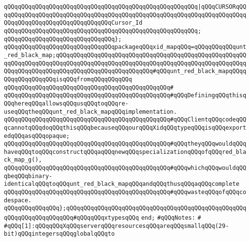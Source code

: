 \verb|qQQqqQQqqQQqqQQqqQQqqQQqqQQqqQQqqQQqqQQqqQQqqQQqqQQqqQQq|\verb#|qQQqCURSORqQQqqQQqqQQqqQQqqQQqqQQqqQQqqQQqqQQqqQQqqQQqqQQqqQQqqQQqqQQqqQQqqQQqqQQqqQQqqQQqqQQqqQQqqQQqqQQqqQQqqQQqCursor_Id#\newline
\verb|qQQqqQQqqQQqqQQqqQQqqQQqqQQqqQQqqQQqqQQqqQQqqQQqqQQqqQQq;|\newline
\verb|qQQqqQQqqQQqqQQqqQQqqQQqqQQqqQQq};|\newline
\newline
\verb|qQQqqQQqqQQqqQQqqQQqqQQqqQQqqQQqpackageqQQqxid_mapqQQq=qQQqqQQqqQQqunt_red_black_map;qQQqqQQqqQQqqQQqqQQqqQQqqQQqqQQqqQQqqQQqqQQqqQQqqQQqqQQqqQQqqQQqqQQqqQQqqQQqqQQqqQQqqQQqqQQqqQQqqQQqqQQqqQQqqQQqqQQqqQQqqQQqqQQqqQQqqQQqqQQqqQQqqQQqqQQqqQQqqQQqqQQqqQQq#qQQqunt_red_black_mapqQQqqQQqqQQqqQQqqQQqisqQQqfromqQQqqQQqqQQq|\newline
\verb|qQQqqQQqqQQqqQQqqQQqqQQqqQQqqQQqqQQqqQQqqQQqqQQq#|\newline
\verb|qQQqqQQqqQQqqQQqqQQqqQQqqQQqqQQqqQQqqQQqqQQqqQQq#qQQqDefiningqQQqthisqQQqhereqQQqallowsqQQqusqQQqtoqQQqre-useqQQqtheqQQqunt_red_black_mapqQQqimplementation.|\newline
\verb|qQQqqQQqqQQqqQQqqQQqqQQqqQQqqQQqqQQqqQQqqQQqqQQq#qQQqClientqQQqcodeqQQqcannotqQQqdoqQQqthisqQQqbecauseqQQqourqQQqXidqQQqtypeqQQqisqQQqexportedqQQqasqQQqopaque;|\newline
\verb|qQQqqQQqqQQqqQQqqQQqqQQqqQQqqQQqqQQqqQQqqQQqqQQq#qQQqtheyqQQqwouldqQQqhaveqQQqtoqQQqconstructqQQqaqQQqnewqQQqspecializationqQQqofqQQqred_black_map_g(),|\newline
\verb|qQQqqQQqqQQqqQQqqQQqqQQqqQQqqQQqqQQqqQQqqQQqqQQq#qQQqwhichqQQqwouldqQQqbeqQQqbinary-identicalqQQqtoqQQqunt_red_black_mapqQQqandqQQqthusqQQqaqQQqcomplete|\newline
\verb|qQQqqQQqqQQqqQQqqQQqqQQqqQQqqQQqqQQqqQQqqQQqqQQq#qQQqwasteqQQqofqQQqcodespace.|\newline
\newline
\verb|qQQqqQQqqQQqqQQq};qQQqqQQqqQQqqQQqqQQqqQQqqQQqqQQqqQQqqQQqqQQqqQQqqQQqqQQqqQQqqQQqqQQqqQQq#qQQqqQQqxtypesqQQq|\newline
\newline
\verb|end;|\newline
\newline
\verb|#qQQqNotes:|\newline
\verb|#|\newline
\verb|#qQQq[1]:qQQqqQQqXqQQqserverqQQqresourcesqQQqareqQQqsmallqQQq(29-bit)qQQqintegersqQQqglobalqQQqto|\newline
